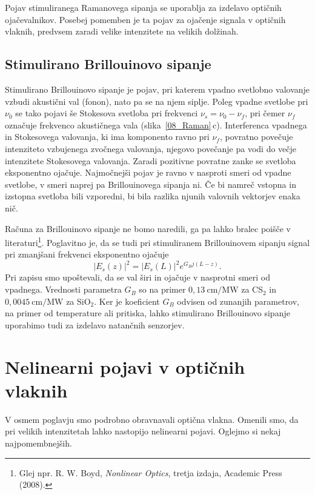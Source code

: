 \begin{remark}
Pojav stimuliranega Ramanovega sipanja se uporablja za izdelavo optičnih 
ojačevalnikov. Posebej pomemben je ta pojav za ojačenje signala v 
optičnih vlaknih, predvsem zaradi velike intenzitete na velikih dolžinah.
\end{remark}

\subsection*{Stimulirano Brillouinovo sipanje}
Stimulirano Brillouinovo sipanje je pojav, pri katerem vpadno svetlobno valovanje
vzbudi akustični val (fonon), nato pa se na njem siplje. Poleg vpadne svetlobe pri $\nu_0$
se tako pojavi še Stokesova svetloba pri frekvenci $\nu_s = \nu_0-\nu_f$, pri čemer 
$\nu_f$ označuje frekvenco akustičnega vala  (slika~\ref{08_Raman}\,c). Interferenca
vpadnega in Stokesovega valovanja, ki ima komponento ravno pri $\nu_f$, povratno
povečuje intenziteto vzbujenega zvočnega valovanja, njegovo povečanje pa vodi do
večje intenzitete Stokesovega valovanja. Zaradi pozitivne povratne zanke se 
svetloba eksponentno ojačuje. Najmočnejši pojav je 
ravno v nasproti smeri od vpadne svetlobe, v smeri naprej pa Brillouinovega sipanja ni.
Če bi namreč vstopna in izstopna svetloba bili vzporedni, bi bila razlika njunih
valovnih vektorjev enaka nič. 

Računa za Brillouinovo sipanje ne bomo naredili, ga pa lahko bralec poišče
v literaturi\footnote{Glej npr. R. W. Boyd, {\it Nonlinear Optics}, tretja izdaja, Academic Press (2008).}. 
Poglavitno 
je, da se tudi pri stimuliranem Brillouinovem sipanju signal pri zmanjšani frekvenci
eksponentno ojačuje
\begin{equation}
|E_s(z)|^2 = |E_s(L)|^2 e^{G_Bj(L-z)}.
\end{equation}
Pri zapisu smo upoštevali, da se val širi in ojačuje v nasprotni smeri od vpadnega.
Vrednosti parametra $G_B$ so na primer $0,13~\si{\cm/\mega\watt}$ za CS$_2$ 
in $0,0045~\si{\cm/\mega\watt}$ za SiO$_2$. 
Ker je koeficient $G_B$ odvisen od zunanjih parametrov, na primer od 
temperature ali pritiska, lahko stimulirano Brillouinovo sipanje uporabimo tudi za
izdelavo natančnih senzorjev. 

\section{Nelinearni pojavi v optičnih vlaknih}
\label{NLOFIB}
V osmem poglavju smo podrobno obravnavali optična vlakna. Omenili smo, da pri 
velikih intenzitetah lahko nastopijo nelinearni pojavi. Oglejmo si nekaj najpomembnejših.

